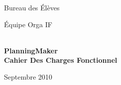 \begin{titlepage}



\begin{minipage}{0.3\textwidth}
\centering

Bureau des Élèves \\

\end{minipage}
\hfill
\begin{minipage}{0.3\textwidth}
\centering

Équipe Orga IF
\end{minipage}


\begin{center} 
\hrulefill \\[0.4cm]
{ \Huge \bfseries PlanningMaker}\\ {  \bfseries Cahier Des Charges Fonctionnel} \\[0.4cm]
 \hrulefill






\vfill
{ Septembre 2010  } \\





\end{center}


\end{titlepage}

